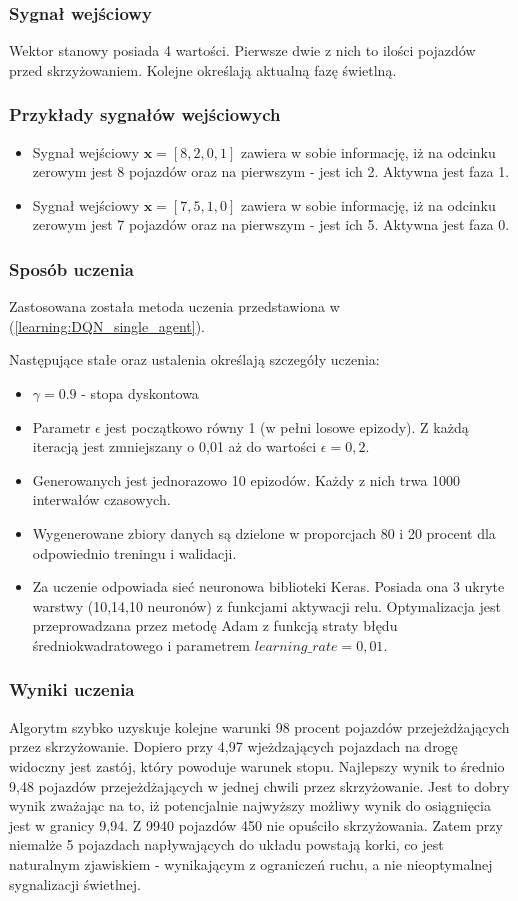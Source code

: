 \documentclass[12pt]{book}
\theoremstyle{plain}
\newcommand{\myref}[1]{(\ref{#1})}
\begin{document}
\subsubsection*{Sygnał wejściowy}
Wektor stanowy posiada 4 wartości. Pierwsze dwie z nich to ilości pojazdów przed skrzyżowaniem. Kolejne określają aktualną fazę świetlną.
\subsubsection*{Przykłady sygnałów wejściowych}
\begin{itemize}
	\item Sygnał wejściowy $ \textbf{x}=[8,2,0,1] $ zawiera w sobie informację, iż na odcinku zerowym jest 8 pojazdów oraz na pierwszym - jest ich 2. Aktywna jest faza 1.
		\item Sygnał wejściowy $ \textbf{x}=[7,5,1,0] $ zawiera w sobie informację, iż na odcinku zerowym jest 7 pojazdów oraz na pierwszym - jest ich 5. Aktywna jest faza 0.
\end{itemize}
\subsubsection{Sposób uczenia}
Zastosowana została metoda uczenia przedstawiona w \myref{learning:DQN_single_agent}. 

Następujące stałe oraz ustalenia określają szczegóły uczenia:
\begin{itemize}
	\item $\gamma = 0.9$ - stopa dyskontowa
	\item Parametr $\epsilon$ jest początkowo równy 1 (w pełni losowe epizody). Z każdą iteracją jest zmniejszany o 0,01 aż do wartości $\epsilon=0,2$.
	\item Generowanych jest jednorazowo 10 epizodów. Każdy z nich trwa 1000 interwałów czasowych.
	\item Wygenerowane zbiory danych są dzielone w proporcjach 80 i 20 procent dla odpowiednio treningu i walidacji.
	\item Za uczenie odpowiada sieć neuronowa biblioteki Keras. Posiada ona 3 ukryte warstwy (10,14,10 neuronów) z funkcjami aktywacji relu. Optymalizacja jest przeprowadzana przez metodę Adam z funkcją straty błędu średniokwadratowego i parametrem $learning\_rate = 0,01$. 
\end{itemize}

\subsubsection*{Wyniki uczenia}
Algorytm szybko uzyskuje kolejne warunki 98 procent pojazdów przejeżdżających przez skrzyżowanie. Dopiero przy 4,97 wjeżdzających pojazdach na drogę widoczny jest zastój, który powoduje warunek stopu.
Najlepszy wynik to średnio 9,48 pojazdów przejeżdżających w jednej chwili przez skrzyżowanie. Jest to dobry wynik zważając na to, iż potencjalnie najwyższy możliwy wynik do osiągnięcia jest w granicy 9,94. Z 9940 pojazdów 450 nie opuściło skrzyżowania. Zatem przy niemalże 5 pojazdach napływających do układu powstają korki, co jest naturalnym zjawiskiem - wynikającym z ograniczeń ruchu, a nie nieoptymalnej sygnalizacji świetlnej.
\end{document}
